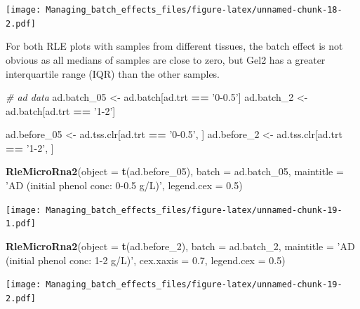 \documentclass[]{book}
\newenvironment{Shaded}{\begin{snugshade}}{\end{snugshade}}
\newcommand{\KeywordTok}[1]{\textcolor[rgb]{0.13,0.29,0.53}{\textbf{#1}}}
\newcommand{\DataTypeTok}[1]{\textcolor[rgb]{0.13,0.29,0.53}{#1}}
\newcommand{\DecValTok}[1]{\textcolor[rgb]{0.00,0.00,0.81}{#1}}
\newcommand{\FloatTok}[1]{\textcolor[rgb]{0.00,0.00,0.81}{#1}}
\newcommand{\StringTok}[1]{\textcolor[rgb]{0.31,0.60,0.02}{#1}}
\newcommand{\CommentTok}[1]{\textcolor[rgb]{0.56,0.35,0.01}{\textit{#1}}}
\newcommand{\OperatorTok}[1]{\textcolor[rgb]{0.81,0.36,0.00}{\textbf{#1}}}
\newcommand{\NormalTok}[1]{#1}
\begin{document}
\texttt{[image: Managing\_batch\_effects\_files/figure-latex/unnamed-chunk-18-2.pdf]}

For both RLE plots with samples from different tissues, the batch effect
is not obvious as all medians of samples are close to zero, but Gel2 has
a greater interquartile range (IQR) than the other samples.

\begin{Shaded}
\begin{Highlighting}[]
\CommentTok{# ad data}
\NormalTok{ad.batch_}\DecValTok{05}\NormalTok{ <-}\StringTok{ }\NormalTok{ad.batch[ad.trt }\OperatorTok{==}\StringTok{ '0-0.5'}\NormalTok{]}
\NormalTok{ad.batch_}\DecValTok{2}\NormalTok{ <-}\StringTok{ }\NormalTok{ad.batch[ad.trt }\OperatorTok{==}\StringTok{ '1-2'}\NormalTok{] }

\NormalTok{ad.before_}\DecValTok{05}\NormalTok{ <-}\StringTok{ }\NormalTok{ad.tss.clr[ad.trt }\OperatorTok{==}\StringTok{ '0-0.5'}\NormalTok{, ]}
\NormalTok{ad.before_}\DecValTok{2}\NormalTok{ <-}\StringTok{ }\NormalTok{ad.tss.clr[ad.trt }\OperatorTok{==}\StringTok{ '1-2'}\NormalTok{, ]}

\KeywordTok{RleMicroRna2}\NormalTok{(}\DataTypeTok{object =} \KeywordTok{t}\NormalTok{(ad.before_}\DecValTok{05}\NormalTok{), }\DataTypeTok{batch =}\NormalTok{ ad.batch_}\DecValTok{05}\NormalTok{, }
             \DataTypeTok{maintitle =} \StringTok{'AD (initial phenol conc: 0-0.5 g/L)'}\NormalTok{, }
             \DataTypeTok{legend.cex =} \FloatTok{0.5}\NormalTok{)}
\end{Highlighting}
\end{Shaded}

\texttt{[image: Managing\_batch\_effects\_files/figure-latex/unnamed-chunk-19-1.pdf]}

\begin{Shaded}
\begin{Highlighting}[]
\KeywordTok{RleMicroRna2}\NormalTok{(}\DataTypeTok{object =} \KeywordTok{t}\NormalTok{(ad.before_}\DecValTok{2}\NormalTok{), }\DataTypeTok{batch =}\NormalTok{ ad.batch_}\DecValTok{2}\NormalTok{, }
             \DataTypeTok{maintitle =} \StringTok{'AD (initial phenol conc: 1-2 g/L)'}\NormalTok{, }
             \DataTypeTok{cex.xaxis =} \FloatTok{0.7}\NormalTok{, }\DataTypeTok{legend.cex =} \FloatTok{0.5}\NormalTok{)}
\end{Highlighting}
\end{Shaded}

\texttt{[image: Managing\_batch\_effects\_files/figure-latex/unnamed-chunk-19-2.pdf]}
\end{document}

